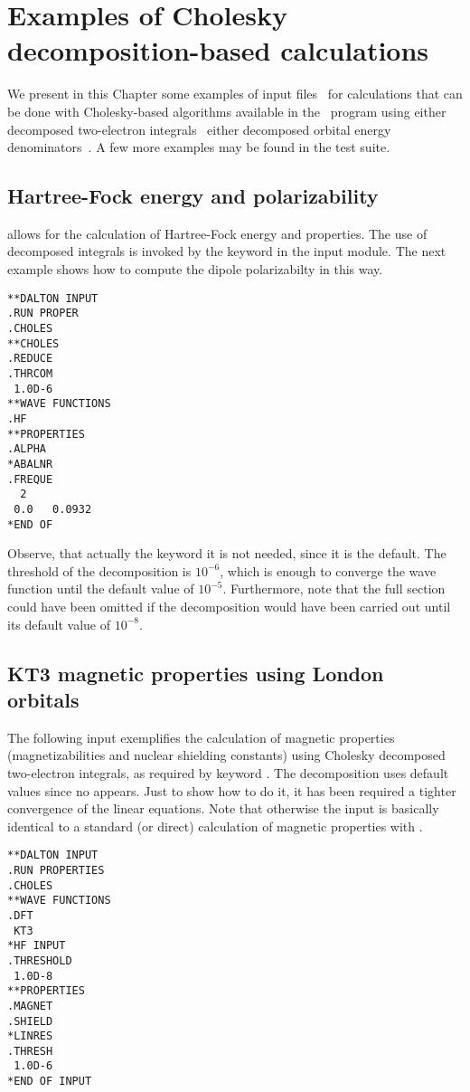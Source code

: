 \chapter{Examples of Cholesky decomposition-based calculations}
\label{ch:choexamples}

We present in this Chapter some examples of input files 
\dalinp\ for calculations that can be done
with Cholesky-based algorithms available in the \dalton\ program 
using either decomposed two-electron 
integrals~\cite{choint,chorsp} either decomposed orbital 
energy denominators~\cite{jcp_chopt,ijqc_chopt}.
A few more examples may be found in the test suite. 


\section{Hartree-Fock energy and polarizability}
%
{\choles}  allows for the calculation of Hartree-Fock energy
and properties. The use of decomposed integrals is invoked by 
the keyword  in the  input module. The
next example shows how to compute the dipole polarizabilty in this
way. 
%
\begin{verbatim}
**DALTON INPUT
.RUN PROPER
.CHOLES
**CHOLES
.REDUCE
.THRCOM
 1.0D-6
**WAVE FUNCTIONS
.HF
**PROPERTIES
.ALPHA
*ABALNR
.FREQUE
  2
 0.0   0.0932
*END OF
\end{verbatim}
Observe, that actually the keyword  it is not needed, since it is
the default. The threshold of the decomposition is $10^{-6}$, which is enough to 
converge the wave function until the default value of $10^{-5}$. Furthermore,
note that the full section  could have been omitted if the
decomposition would have been carried out until its default value of $10^{-8}$.

\section{KT3 magnetic properties using London orbitals}

The following input exemplifies the calculation of magnetic properties 
(magnetizabilities and nuclear shielding constants) using Cholesky
decomposed two-electron integrals, as required by keyword .
The decomposition uses default values since no  appears.
Just to show how to do it, it has been required a tighter convergence
of the linear equations.  Note that otherwise the input is basically identical 
to a standard (or direct) calculation of magnetic properties with {\dalton}.
\begin{verbatim}
**DALTON INPUT
.RUN PROPERTIES
.CHOLES
**WAVE FUNCTIONS
.DFT
 KT3
*HF INPUT
.THRESHOLD
 1.0D-8
**PROPERTIES
.MAGNET
.SHIELD
*LINRES
.THRESH
 1.0D-6
*END OF INPUT
\end{verbatim}


